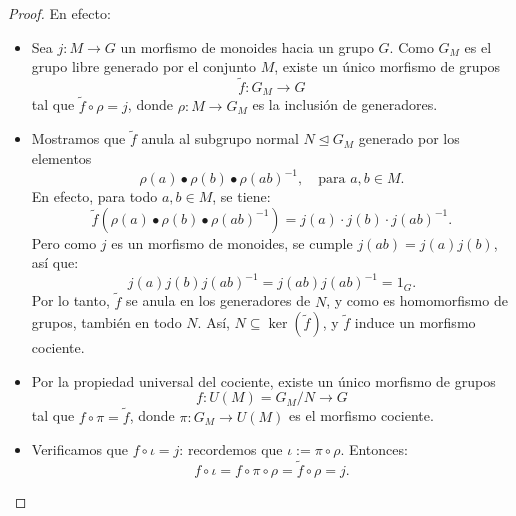   \begin{proposicion}
  \end{proposicion}
  

\begin{proof}
	En efecto:
	\begin{itemize}
		\item Sea \( j : M \to G \) un morfismo de monoides hacia un grupo \( G \). Como \( G_M \) es el grupo libre generado por el conjunto \( M \), existe un único morfismo de grupos
		\[
		\tilde{f} : G_M \to G
		\]
		tal que \( \tilde{f} \circ \rho = j \), donde \( \rho : M \to G_M \) es la inclusión de generadores.
		
		\item Mostramos que \( \tilde{f} \) anula al subgrupo normal \( N \trianglelefteq G_M \) generado por los elementos
		\[
		\rho(a)\bullet \rho(b)\bullet \rho(ab)^{-1}, \quad \text{para } a, b \in M.
		\]
		En efecto, para todo \( a, b \in M \), se tiene:
		\[
		\tilde{f}(\rho(a)\bullet \rho(b)\bullet \rho(ab)^{-1}) = j(a) \cdot j(b) \cdot j(ab)^{-1}.
		\]
		Pero como \( j \) es un morfismo de monoides, se cumple \( j(ab) = j(a)j(b) \), así que:
		\[
		j(a)j(b)j(ab)^{-1} = j(ab)j(ab)^{-1} = 1_G.
		\]
		Por lo tanto, \( \tilde{f} \) se anula en los generadores de \( N \), y como es homomorfismo de grupos, también en todo \( N \). Así, \( N \subseteq \ker(\tilde{f}) \), y \( \tilde{f} \) induce un morfismo cociente.
		
		\item Por la propiedad universal del cociente, existe un único morfismo de grupos
		\[
		f : U(M) = G_M/N \to G
		\]
		tal que \( f \circ \pi = \tilde{f} \), donde \( \pi : G_M \to U(M) \) es el morfismo cociente.
		
		\item Verificamos que \( f \circ \iota = j \): recordemos que \( \iota := \pi \circ \rho \). Entonces:
		\[
		f \circ \iota = f \circ \pi \circ \rho = \tilde{f} \circ \rho = j.
		\]
		

\end{itemize}
\end{proof}
